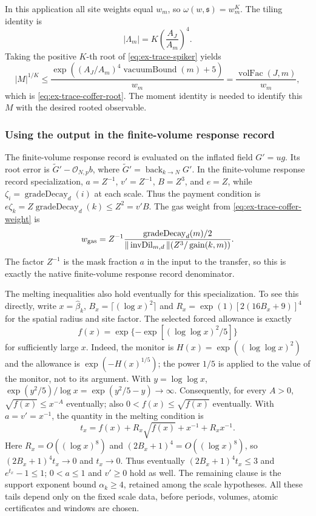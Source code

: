 In this application all site weights equal \(w_m\), so
\(\omega(w,\mathfrak s)=w_m^K\). The tiling identity is
\[
 |\Lambda_m|=K\left(\frac{A_J}{A_m}\right)^4.
\]
Taking the positive \(K\)-th root of \eqref{eq:ex-trace-spiker} yields
\[
 |M|^{1/K}\leq
 \frac{\exp((A_J/A_m)^4\operatorname{vacuumBound}(m)+5)}{w_m}
 =\frac{\operatorname{volFac}(J,m)}{w_m},
\]
which is \eqref{eq:ex-trace-coffer-root}. The moment identity is needed to
identify this \(M\) with the desired rooted observable.

\subsubsection{Using the output in the finite-volume response record}

The finite-volume response record is evaluated on the inflated field \(G'=u g\). Its root error is
\(\widetilde G'-\mathcal O_{N,p}b\), where
\(\widetilde G'=\operatorname{back}_{k\to N}G'\). In the finite-volume response record specialization, \(a=Z^{-1}\), \(v'=Z^{-1}\), \(B=Z^3\), and \(e=Z\), while \(\zeta_i=\operatorname{gradeDecay}_d(i)\) at each scale. Thus the payment condition is \(e\zeta_k=Z\operatorname{gradeDecay}_d(k)\leq Z^2=v'B\). The gas weight
from \eqref{eq:ex-trace-coffer-weight} is
\[
 w_{\rm gas}=Z^{-1}
 \frac{\operatorname{gradeDecay}_d(m)/2}
 {\|\operatorname{invDil}_{m,d}\|(Z^3/\operatorname{gain}(k,m))}.
\]
The factor $Z^{-1}$ is the mask fraction $a$ in the input to the transfer, so this is
exactly the native finite-volume response record denominator.

The melting inequalities also hold eventually for this specialization.
To see this directly, write $x=\widehat\beta_k$, $B_x=\lceil(\log x)^2\rceil$
and $R_x=\exp(1)[2(16B_x+9)]^4$ for the spatial radius and site factor.
The selected forced allowance is exactly
\[
 f(x)=\exp\{-\exp[(\log\log x)^2/5]\}
\]
for sufficiently large $x$. Indeed, the monitor is
$H(x)=\exp((\log\log x)^2)$ and the allowance is
$\exp(-H(x)^{1/5})$; the power $1/5$ is applied to the value of the
monitor, not to its argument. With $y=\log\log x$,
$\exp(y^2/5)/\log x=\exp(y^2/5-y)\to\infty$.
Consequently, for every $A>0$, $\sqrt{f(x)}\le x^{-A}$ eventually;
also $0<f(x)\le\sqrt{f(x)}$ eventually. With $a=v'=x^{-1}$, the
quantity in the melting condition is
\[
 t_x=f(x)+R_x\sqrt{f(x)}+x^{-1}+R_xx^{-1}.
\]
Here $R_x=O((\log x)^8)$ and $(2B_x+1)^4=O((\log x)^8)$, so
$(2B_x+1)^4t_x\to0$ and $t_x\to0$.
Thus eventually $(2B_x+1)^4t_x\le3$ and $e^{t_x}-1\le1$;
$0<a\le1$ and $v'\ge0$ hold as well. The remaining clause is the
support exponent bound $\alpha_k\ge4$, retained among the scale
hypotheses. All these tails depend only on the fixed scale data, before
periods, volumes, atomic certificates and windows are chosen.

